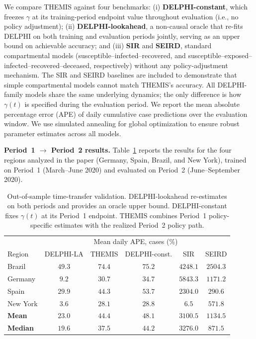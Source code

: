 \documentclass[letterpaper,twoside,11pt]{reviewresponse}
\begin{document}
We compare THEMIS against four benchmarks: (i) \textbf{DELPHI-constant}, which freezes $\gamma$ at its training-period endpoint value throughout evaluation (i.e., no policy adjustment); (ii) \textbf{DELPHI-lookahead}, a non-causal oracle that re-fits DELPHI on both training and evaluation periods jointly, serving as an upper bound on achievable accuracy; and (iii) \textbf{SIR} and \textbf{SEIRD}, standard compartmental models (susceptible--infected--recovered, and susceptible--exposed--infected--recovered--deceased, respectively) without any policy-adjustment mechanism. The SIR and SEIRD baselines are included to demonstrate that simple compartmental models cannot match THEMIS's accuracy. All DELPHI-family models share the same underlying dynamics; the only difference is how $\gamma(t)$ is specified during the evaluation period. We report the mean absolute percentage error (APE) of daily cumulative case predictions over the evaluation window. We use simulated annealing for global optimization to ensure robust parameter estimates across all models.

\textbf{Period~1 $\to$ Period~2 results.} Table~\ref{tab:time_transfer_main_r1} reports the results for the four regions analyzed in the paper (Germany, Spain, Brazil, and New York), trained on Period~1 (March--June 2020) and evaluated on Period~2 (June--September 2020).

\begin{table}[h!]
	\centering
	\begin{tabular}{|l|ccccc|}
		\hline
		& \multicolumn{5}{c|}{Mean daily APE, cases (\%)} \\
		Region & DELPHI-LA  & THEMIS & DELPHI-const. & SIR & SEIRD \\\hline
		Brazil     & $49.3$ & $\mathbf{74.4}$ & $75.2$ & $4248.1$ & $2504.3$ \\
		Germany    & $9.2$  & $\mathbf{30.7}$ & $34.7$ & $5843.3$ & $1171.2$ \\
		Spain      & $29.9$  & $\mathbf{44.3}$ & $53.7$ & $2304.0$ & $290.6$ \\
		New York   & $3.6$    & $\mathbf{28.1}$ & $28.8$ & $6.5$    & $571.8$ \\\hline
		\textbf{Mean}   & $23.0$ & $\mathbf{44.4}$ & $48.1$ & $3100.5$ & $1134.5$ \\
		\textbf{Median} & $19.6$  & $\mathbf{37.5}$ & $44.2$ & $3276.0$ & $871.5$ \\\hline
	\end{tabular}
	\caption{Out-of-sample time-transfer validation. DELPHI-lookahead re-estimates on both periods and provides an oracle upper bound. DELPHI-constant fixes $\gamma(t)$ at its Period~1 endpoint. THEMIS combines Period~1 policy-specific estimates with the realized Period~2 policy path.}
	\label{tab:time_transfer_main_r1}
\end{table}
\end{document}
